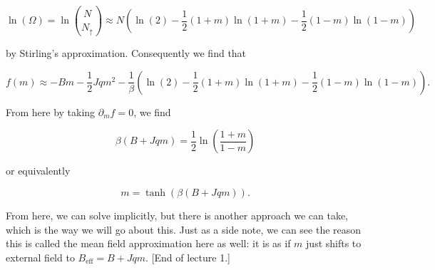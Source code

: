 \documentclass{article}
\theoremstyle{definition}
\begin{document}
$$ \ln(\Omega) = \ln \binom{N}{N_\uparrow} \approx N (\ln(2) - \frac{1}{2}(1 +
m) \ln(1 + m) - \frac{1}{2} (1 - m) \ln(1 - m)) $$

by Stirling's approximation. Consequently we find that

$$ f(m) \approx -Bm - \frac{1}{2} J q m^2 - \frac{1}{\beta} (\ln(2) -
\frac{1}{2} (1 + m) \ln(1 + m) - \frac{1}{2} (1 - m) \ln(1 - m)). $$

From here  by taking $\partial_m f = 0$, we find

$$ \beta(B + Jqm) = \frac{1}{2} \ln \left( \frac{1 + m}{1 - m} \right) $$

or equivalently

$$ m = \tanh(\beta (B + Jqm)). $$

From here, we can solve implicitly, but there is another approach we can take,
which is the way we will go about this. Just as a side note, we can see the
reason this is called the mean field approximation here as well: it is as if $m$
just shifts to external field to $B_{\text{eff}} = B + Jqm$. [End of lecture 1.]
\end{document}

